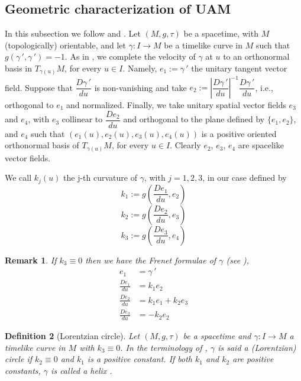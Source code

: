\documentclass[11pt]{book}
\newtheorem{defi}{Definition}[chapter]
\newtheorem{rem}[defi]{Remark}
\begin{document}
\subsection{Geometric characterization of UAM}\label{geometric characterization UAM}
In this subsection we follow \cite{KGR} and \cite{CSMS}.
Let $(M,g,\tau)$ be a spacetime, with $M$ (topologically) orientable, and let $\gamma:I\to M$ be a timelike curve in $M$ such that $g(\gamma{\,'}, \gamma{\,'})=-1$. As in \cite{CSMS}, we complete the velocity of $\gamma$ at $u$ to an orthonormal basis in $T_{\gamma(u)}M$, for every $u\in I$. Namely, $e_1:=\gamma{\,'}$ the unitary tangent vector field. Suppose that $\dfrac{D\gamma{\,'}}{du}$ is non-vanishing and take $e_2:=\left|\dfrac{D\gamma{\,'}}{du}\right|^{-1}\dfrac{D\gamma{\,'}}{du}$, i.e., orthogonal to $e_1$ and normalized. Finally, we take unitary spatial vector fields $e_3$ and $e_4$, with $e_3$ collinear to $\dfrac{De_2}{du}$ and orthogonal to the plane defined by $\{e_1,e_2\}$, and $e_4$ such that $(e_1(u),e_2(u), e_3(u), e_4(u))$ is a positive oriented orthonormal basis of $T_{\gamma(u)}M$, for every $u\in I$. Clearly $e_2$, $e_3$, $e_4$ are spacelike vector fields. 

We call $k_j(u)$ the j-th curvature of $\gamma$, with $j=1,2,3$, in our case defined by
\[
k_1:=g\left(\frac{De_1}{du},e_2\right)
\]
\[
k_2:=g\left(\frac{De_2}{du},e_3\right)
\]
\[
k_3:=g\left(\frac{De_3}{du},e_4\right)
\]

\begin{rem}
	{\rm
		If $k_3\equiv 0$ then we have the Frenet formulae of $\gamma$ (see \cite{OCS}),
		\begin{align*}
			e_1 &=\gamma{\,'} \\
			\frac{De_1}{du} &=k_1 e_2 \\
			\frac{De_2}{du} &=k_1 e_1+k_2 e_3 \\
			\frac{De_3}{du} &=-k_2 e_2
		\end{align*}
	}
\end{rem}

\begin{defi}[Lorentzian circle]
	Let $(M,g,\tau)$ be a spacetime and $\gamma:I\to M$ a timelike curve in $M$ with $k_3\equiv 0$. In the terminology of \cite{KGR}, $\gamma$ is said a (Lorentzian) circle if $k_2\equiv 0$ and $k_1$ is a positive constant. If both $k_1$ and $k_2$ are positive constants, $\gamma$ is called a helix . 
\end{defi}
\end{document}
